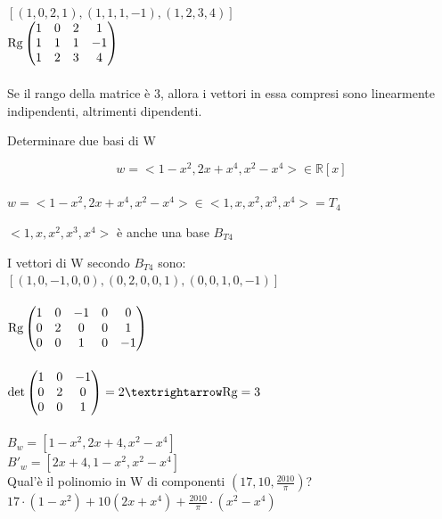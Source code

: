\begin{proposizione}
\begin{es}
    $[(1,0,2,1),(1,1,1,-1),(1,2,3,4)]$
    \leavevmode\\
    $\textnormal{Rg}\begin{pmatrix}
    	1 & 0 & 2 & 1\\
    	1 & 1 & 1 & -1\\
		1 &2 &3 &4    	
    \end{pmatrix}$
    \leavevmode\\\\
    Se il rango della matrice è 3, allora i vettori in essa compresi sono linearmente indipendenti, altrimenti dipendenti.
  \end{es}
\end{proposizione}

\begin{esercizio}
	Determinare due basi di W

	$$w=<1-x^2,2x+x^4,x^2-x^4>\in\mathbb{R}[x]$$
	\leavevmode\\
	$w=<1-x^2,2x+x^4,x^2-x^4>\in<1,x,x^2,x^3,x^4>=T_4$
	
	\begin{nota}
		$<1,x,x^2,x^3,x^4>$ è anche una base $B_{T4}$
	\end{nota}
	\leavevmode
	I vettori di W secondo $B_{T4}$ sono:
	\leavevmode\\
	$[(1,0,-1,0,0),(0,2,0,0,1),(0,0,1,0,-1)]$
	\leavevmode\\\\
	$
	\textnormal{Rg}\begin{pmatrix}
		1 &0 &-1 &0 &0\\
		0 &2 &0 &0 &1\\
		0 &0 &1 &0 &-1
	\end{pmatrix}
	$
	\leavevmode\\\\
	$
	\det\begin{pmatrix}
		1 &0 &-1\\
		0 &2 &0\\
		0 &0 &1
	\end{pmatrix}=2\textrightarrow\textnormal{Rg}=3
	$
	\leavevmode\\\\
	$B_w=[1-x^2,2x+4,x^2-x^4]$
	\leavevmode\\
	$B'_w=[2x+4,1-x^2,x^2-x^4]$
	\leavevmode\\
	Qual'è il polinomio in W di componenti $(17,10,\frac{2010}{\pi})$?
	\leavevmode\\
	$17\cdot(1-x^2)+10(2x+x^4)+\frac{2010}{\pi}\cdot(x^2-x^4)$
\end{esercizio}

